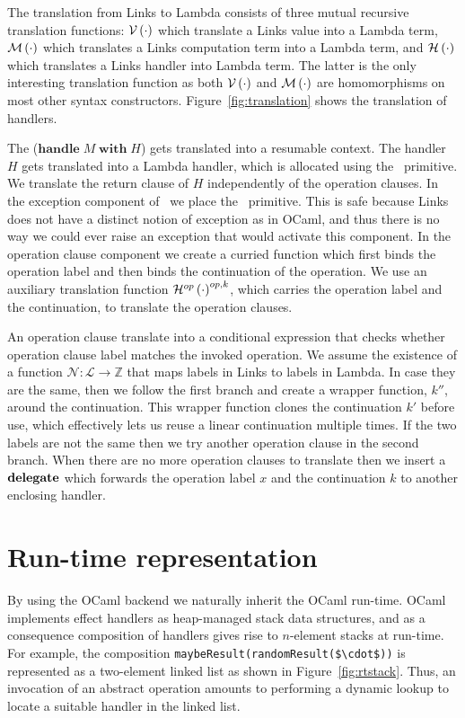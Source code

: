 \documentclass[12pt,mscres,cdtppar,twoside,openright,logo,rightchapter,normalheadings]{infthesis}
\theoremstyle{definition}
\newcommand{\keyw}[1]{\textbf{#1}}
\newcommand{\Handle}{\keyw{handle}}
\newcommand{\With}{\keyw{with}}
\begin{document}
The translation from Links to Lambda consists of three mutual
recursive translation functions: $\mathcal{V}\left(\cdot\right)$ which translate a
Links value into a Lambda term, $\mathcal{M}\left(\cdot\right)$ which translates a
Links computation term into a Lambda term, and $\mathcal{H}\left(\cdot\right)$ which
translates a Links handler into Lambda term. The latter is the only
interesting translation function as both $\mathcal{V}\left(\cdot\right)$ and
$\mathcal{M}\left(\cdot\right)$ are homomorphisms on most other syntax constructors.
Figure~\ref{fig:translation} shows the translation of handlers.

The ($\Handle\; M \; \With\; H$) gets translated into a resumable
context. The handler $H$ gets translated into a Lambda handler, which
is allocated using the \Alloc\ primitive. We translate the
return clause of $H$ independently of the operation clauses. In the
exception component of \Alloc\ we place the \Error\ primitive. This is
safe because Links does not have a distinct notion of exception as in
OCaml, and thus there is no way we could ever raise an exception that
would activate this component. In the operation clause component we
create a curried function which first binds the operation label and
then binds the continuation of the operation. We use an auxiliary
translation function $\mathcal{H}^{op}\left(\cdot\right)^{op,k}$, which carries the
operation label and the continuation, to translate the operation
clauses.

An operation clause translate into a conditional expression that
checks whether operation clause label matches the invoked
operation. We assume the existence of a function
$\mathcal{N} : \mathcal{L} \to \mathbb{Z}$ that maps labels in Links
to labels in Lambda. In case they are the same, then we follow the
first branch and create a wrapper function, $k''$, around the
continuation. This wrapper function clones the continuation $k'$
before use, which effectively lets us reuse a linear continuation
multiple times. If the two labels are not the same then we try another
operation clause in the second branch. When there are no more
operation clauses to translate then we insert a $\Delegate$ which
forwards the operation label $x$ and the continuation $k$ to another
enclosing handler.

\section{Run-time representation}
\label{sec:representation}
By using the OCaml backend we naturally inherit the OCaml
run-time. OCaml implements effect handlers as heap-managed stack data
structures, and as a consequence composition of handlers gives rise to
$n$-element stacks at run-time. For example, the composition
\lstinline[mathescape]!maybeResult(randomResult($\cdot$))! is
represented as a two-element linked list as shown in
Figure~\ref{fig:rtstack}. Thus, an invocation of an abstract operation
amounts to performing a dynamic lookup to locate a suitable handler in
the linked list.
\end{document}
